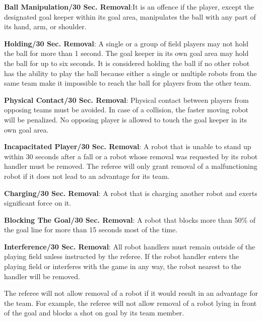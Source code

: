 \documentclass[12pt]{hurocup}
\begin{document}
\begin{lawlist}[US]

\item \textbf{Ball Manipulation/30 Sec. Removal}:It is an offence if the
  player, except the designated goal keeper within its goal area,
  manipulates the ball with any part of its hand, arm, or shoulder.

\item \textbf{Holding/30 Sec. Removal}: A single or a group of field
  players may not hold the ball for more than 1 second. The goal
  keeper in its own goal area may hold the ball for up to six
  seconds. It is considered holding the ball if no other robot has the
  ability to play the ball because either a single or multiple robots
  from the same team make it impossible to reach the ball for players
  from the other team.

\item \textbf{Physical Contact/30 Sec. Removal}: Physical contact
  between players from opposing teams must be avoided. In case of a
  collision, the faster moving robot will be penalized. No opposing
  player is allowed to touch the goal keeper in its own goal area.

\item \textbf{Incapacitated Player/30 Sec. Removal}: A robot that is
  unable to stand up within 30 seconds after a fall or a robot whose
  removal was requested by its robot handler must be removed. The
  referee will only grant removal of a malfunctioning robot if it does
  not lead to an advantage for its team.

\item \textbf{Charging/30 Sec. Removal}: A robot that is charging
  another robot and exerts significant force on it.

\item \textbf{Blocking The Goal/30 Sec. Removal}: A robot that blocks
  more than 50\% of the goal line for more than 15 seconds most of the
  time.

\item \textbf{Interference/30 Sec. Removal}: All robot handlers must
  remain outside of the playing field unless instructed by the
  referee. If the robot handler enters the playing field or interferes
  with the game in any way, the robot nearest to the handler will be
  removed.

\end{lawlist}

\begin{decisions}
\item The referee will not allow removal of a robot if it would result
  in an advantage for the team. For example, the referee will not
  allow removal of a robot lying in front of the goal and blocks a
  shot on goal by its team member.
\end{decisions}
\end{document}
